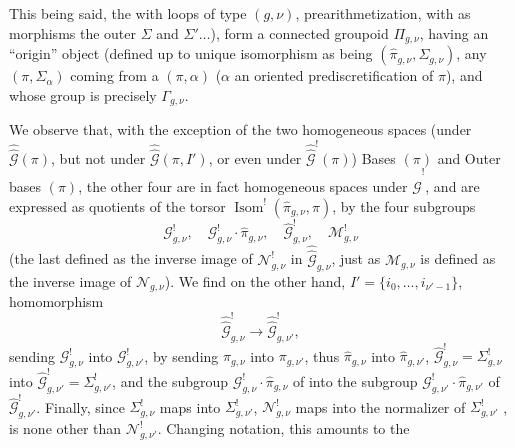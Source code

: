 This being said, the 
  with loops of type $(g,\nu)$,
 prearithmetization,
with as morphisms the  outer 
 $\Sigma$ and $\Sigma'\ldots$),
form a connected groupoid $\Pi_{g,\nu}$, having an ``origin'' object
(defined up to unique isomorphism as being $(\widehat{\pi}_{g,\nu},\Sigma_{g,\nu})$,
 any $(\pi,\Sigma_{\alpha})$ coming from a
$(\pi,\alpha)$ ($\alpha$ an oriented prediscretification of $\pi$),
and whose group   is precisely $\Gamma_{g,\nu}$.


We observe that, with the exception of the two homogeneous spaces
(under $\widehat{\widehat{\mathcal G}}(\pi)$, but not  under
$\widehat{\widehat{\mathcal G}}(\pi,I')$, or even under
$\widehat{\widehat{\mathcal G}}^{!}(\pi)$) Bases $(\pi)$ and Outer bases $(\pi)$,
the other four are in fact homogeneous spaces under
$\widehat{\widehat{\mathcal G}}^{!}$, and are expressed as quotients of the
torsor
$\operatorname{Isom}^{!}(\widehat{\pi}_{g,\nu},\pi)$, by the four subgroups
\[
\mathcal G^{!}_{g,\nu},\quad
\mathcal G^{!}_{g,\nu}\cdot\widehat{\pi}_{g,\nu},\quad
\widehat{\mathcal G}^{!}_{g,\nu},\quad
\mathcal M^{!}_{g,\nu}
\]
(the last defined as the inverse image of $\mathcal N^{!}_{g,\nu}$ in
$\widehat{\widehat{\mathcal G}}_{g,\nu}$, just as $\mathcal M_{g,\nu}$ is defined
as the inverse image of $\mathcal N_{g,\nu}$).
We find on the other hand,  $I'=\{i_0,\ldots,i_{\nu'-1}\}$,
 homomorphism
\[
\widehat{\widehat{\mathcal G}}^{!}_{g,\nu}\longrightarrow
\widehat{\widehat{\mathcal G}}^{!}_{g,\nu'},
\]
sending $\mathcal G^{!}_{g,\nu}$ into $\mathcal G^{!}_{g,\nu'}$,
by sending $\pi_{g,\nu}$ into $\pi_{g,\nu'}$, thus $\widehat{\pi}_{g,\nu}$
into $\widehat{\pi}_{g,\nu'}$,
$\widehat{\mathcal G}^{!}_{g,\nu}=\Sigma^{!}_{g,\nu}$ into
$\widehat{\mathcal G}^{!}_{g,\nu'}=\Sigma^{!}_{g,\nu'}$, and the subgroup
$\mathcal G^{!}_{g,\nu}\cdot\widehat{\pi}_{g,\nu}$ of
 
into the subgroup $\mathcal G^{!}_{g,\nu'}\cdot\widehat{\pi}_{g,\nu'}$ of
$\widehat{\mathcal G}^{!}_{g,\nu'}$.
Finally, since $\Sigma^{!}_{g,\nu}$ maps into $\Sigma^{!}_{g,\nu'}$,
 $\mathcal N^{!}_{g,\nu}$ maps into the normalizer
of $\Sigma^{!}_{g,\nu'}$ ,
 is none other than $\mathcal N^{!}_{g,\nu'}$.
Changing notation, this amounts to the


